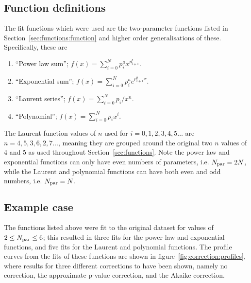 \subsection{Function definitions}
\label{sec:correction:functions}
The fit functions which were used are the two-parameter functions listed in
Section~\ref{sec:functions:function} and higher order generalisations of
these. Specifically, these are
\begin{enumerate}
\item
``Power law sum''; $f(x) = \sum_{i=0}^N p^{a}_{i} x^{p^{b}_{i+1}}$.
\item
``Exponential sum''; $f(x) = \sum_{i=0}^N p^{a}_{i} e^{p^{b}_{i+1}x}$.
\item
``Laurent series''; $f(x) = \sum_{i=0}^N p_i/x^n$.
\item
``Polynomial''; $f(x) = \sum_{i=0}^N p_i x^i$.
\end{enumerate}
The Laurent function values of $n$ used for $i=0,1,2,3,4,5\dots$ are
$n=4,5,3,6,2,7\dots$, meaning they are grouped around the original
two $n$ values of 4 and 5 as used throughout Section~\ref{sec:functions}.
Note the power law and exponential functions can only have even numbers of
parameters, i.e. $N_{\rm par}=2N$, while the Laurent and polynomial functions
can have both even and odd numbers, i.e. $N_{\rm par}=N$.


\subsection{Example case}
\label{sec:correction:example}

The functions listed above were fit to the original dataset for values of
$2 \le N_{\rm par} \le 6$; this resulted in three fits for the power law and
exponential functions, and five fits for the Laurent and polynomial functions.
The profile curves from the fits of these functions are shown in
figure~\ref{fig:correction:profiles}, where results for three different
corrections to \nll have been shown, namely no correction, the approximate
p-value correction, and the Akaike correction.

